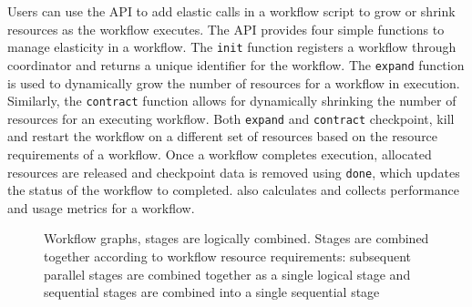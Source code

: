 Users can use the \systemname API to add elastic calls in a workflow script
to grow or shrink resources as the workflow executes.
The \systemname API provides four simple functions to manage elasticity
in a workflow. The \texttt{init} function registers a workflow through
\systemname coordinator and returns a unique identifier for the workflow.
The \texttt{expand} function is used to
dynamically grow the number of resources for a workflow in execution.
Similarly, the \texttt{contract}
function allows for dynamically shrinking the number of resources for an
executing workflow. Both \texttt{expand} and \texttt{contract} 
checkpoint, kill and restart the workflow on a different set of resources
based on the resource requirements of a workflow. Once a workflow completes
execution, allocated resources are released and checkpoint data is removed
using \texttt{done}, which updates the status of the workflow to completed.
\systemname also calculates and collects performance and usage metrics for a workflow.
\begin{figure*}[htbp]
	\centering
	\qquad
	\qquad
	\caption{\small
	Workflow graphs, stages are logically combined.
          Stages are combined together according to workflow resource requirements:
          subsequent parallel stages are combined together as a single logical stage
          and sequential stages are combined into a single sequential stage
          }
	\label{fig:workflow_dags}
	\vspace{-0.4cm}
\end{figure*}

\vspace{-0.3cm}
